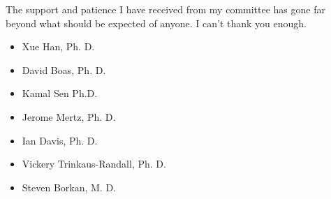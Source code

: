 The support and patience I have received from my committee has gone far beyond what should be expected of anyone.
I can't thank you enough.
\begin{itemize}
	\item Xue Han, Ph.
	      D.
	\item David Boas, Ph.
          D.
    \item Kamal Sen Ph.D.
	\item Jerome Mertz, Ph.
	      D.
	\item Ian Davis, Ph.
	      D.
	\item Vickery Trinkaus-Randall, Ph.
	      D.
	\item Steven Borkan, M.
	      D.
\end{itemize}

\vskip 1in
